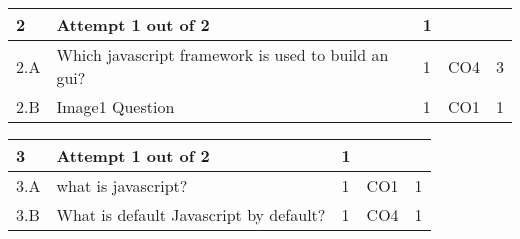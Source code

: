 \documentclass[12pt]{article}
\begin{document}
	
	


	
	
		

	
	
	\begin{tabular}{|L{1cm}|L{8cm}|C{1cm}|C{1cm}|C{1cm}|}\hline
			\bf2 & \bf{Attempt} \bf1 out of \bf2 & \bf1 & & \\ \hline
				2.A &
	Which javascript framework is used to build an gui? \newline
		 &  1 & CO4 & 3\\ \hline
		2.B &
	Image1 Question \newline
		 &  1 & CO1 & 1\\ \hline
		\end{tabular}

	
	


	
	
		

	
	
	\begin{tabular}{|L{1cm}|L{8cm}|C{1cm}|C{1cm}|C{1cm}|}\hline
			\bf3 & \bf{Attempt} \bf1 out of \bf2 & \bf1 & & \\ \hline
				3.A &
	what is javascript? \newline
		 &  1 & CO1 & 1\\ \hline
		3.B &
	What is default Javascript by default? \newline
		 &  1 & CO4 & 1\\ \hline
		\end{tabular}

	
	


	
	
		
	
\end{document}
